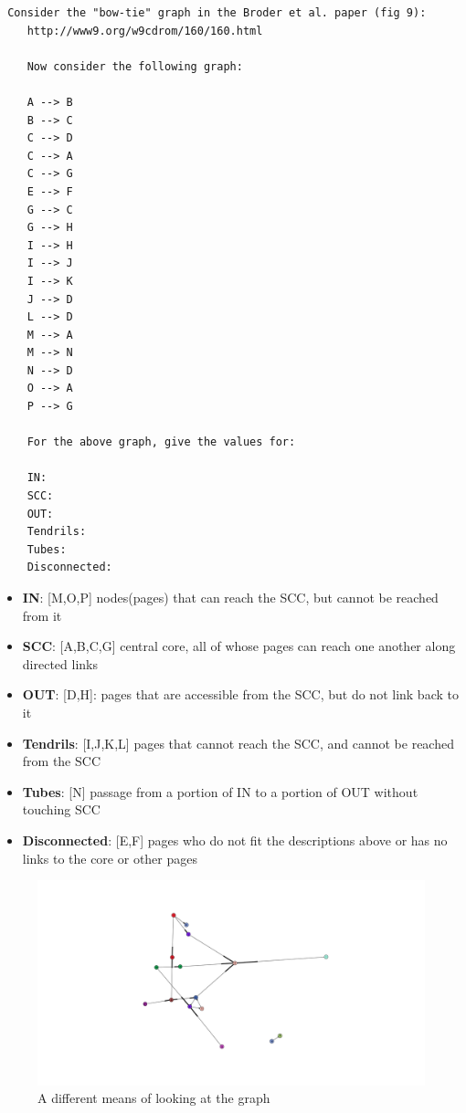 \documentclass[letterpaper,10pt]{article}
\begin{document}
\begin{verbatim}
 Consider the "bow-tie" graph in the Broder et al. paper (fig 9):
    http://www9.org/w9cdrom/160/160.html

    Now consider the following graph:

    A --> B
    B --> C
    C --> D
    C --> A
    C --> G
    E --> F
    G --> C
    G --> H
    I --> H
    I --> J
    I --> K
    J --> D 
    L --> D
    M --> A
    M --> N
    N --> D
    O --> A
    P --> G 
    
    For the above graph, give the values for:

    IN: 
    SCC: 
    OUT: 
    Tendrils: 
    Tubes: 
    Disconnected:
\end{verbatim}

\begin{itemize}
\item \textbf{IN}: [M,O,P]  nodes(pages) that can reach the SCC, but cannot be reached from it
\item \textbf{SCC}: [A,B,C,G]  central core, all of whose pages can reach one another along directed links
\item \textbf{OUT}: [D,H]: pages that are accessible from the SCC, but do not link back to it
\item \textbf{Tendrils}: [I,J,K,L] pages that cannot reach the SCC, and cannot be reached from the SCC


\item \textbf{Tubes}: [N]  passage from a portion of IN to a portion of OUT without touching SCC 
  
\item   \textbf{Disconnected}: [E,F] pages who do not fit the descriptions above or has no links to the core or other pages

\end{itemize}

\begin{figure}[!ht]
\includegraphics[scale=0.3]{images/bowTie.png}
\caption{A different means of looking at the graph}
\label{fig:bt1}
\end{figure}
\end{document}
